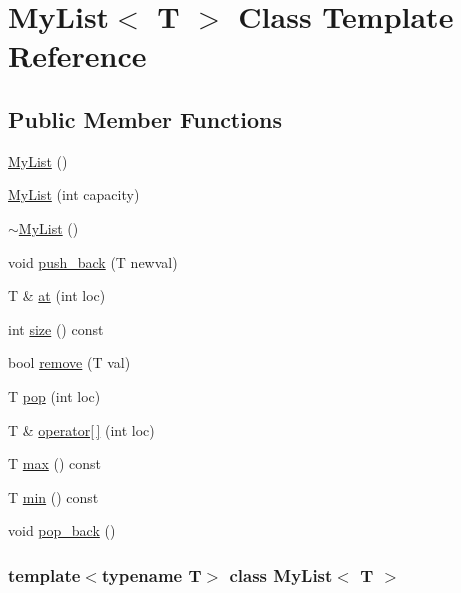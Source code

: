\hypertarget{classMyList}{\section{\-My\-List$<$ \-T $>$ \-Class \-Template \-Reference}
\label{classMyList}
}
\subsection*{\-Public \-Member \-Functions}
\begin{DoxyCompactItemize}
\item 
\hyperlink{classMyList_aaa11039853c7adb2fbcb770eab8b7305}{\-My\-List} ()
\item 
\hyperlink{classMyList_a43e0aa06b56b08ab65d9f8b7086aeb92}{\-My\-List} (int capacity)
\item 
\hyperlink{classMyList_aa622b9fb3e108b8b8c298ef1996dd256}{$\sim$\-My\-List} ()
\item 
void \hyperlink{classMyList_a55eebaa813ab6e221b5a7c25c790c9d2}{push\-\_\-back} (\-T newval)
\item 
\-T \& \hyperlink{classMyList_aede5c62a87c09cd4c7a36ad34d55fb9d}{at} (int loc)
\item 
int \hyperlink{classMyList_a290dc305556aadc0d4c68b456987a7d0}{size} () const 
\item 
bool \hyperlink{classMyList_a7f8a0f53d5153886cb5d6dcca9a07ff3}{remove} (\-T val)
\item 
\-T \hyperlink{classMyList_aca4ff0b35241e2a7e3953b123621e2fb}{pop} (int loc)
\item 
\-T \& \hyperlink{classMyList_ac042422a2d7dcc3fb90eda17f5e2970a}{operator\mbox{[}$\,$\mbox{]}} (int loc)
\item 
\-T \hyperlink{classMyList_a4f422fc82b3b0a94788d3792d4dba57c}{max} () const 
\item 
\-T \hyperlink{classMyList_a8718b2b826ee315d3f730cf52193b11e}{min} () const 
\item 
void \hyperlink{classMyList_a6e671ba282372c9280fbdb1b0852cd80}{pop\-\_\-back} ()
\end{DoxyCompactItemize}
\subsubsection*{template$<$typename \-T$>$ class My\-List$<$ T $>$}



